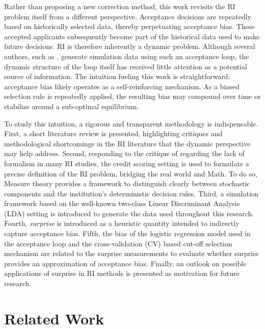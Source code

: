 \documentclass[
  12pt,
]{article}
\begin{document}
Rather than proposing a new correction method, this work revisits the RI
problem itself from a different perspective. Acceptance decisions are
repeatedly based on historically selected data, thereby perpetuating
acceptance bias. These accepted applicants subsequently become part of
the historical data used to make future decisions. RI is therefore
inherently a dynamic problem. Although several authors, such as
\textcite{kozdoi_et_al_BE_BASL}, generate simulation data using such an
acceptance loop, the dynamic structure of the loop itself has received
little attention as a potential source of information. The intuition
fueling this work is straightforward: acceptance bias likely operates as
a self-reinforcing mechanism. As a biased selection rule is repeatedly
applied, the resulting bias may compound over time or stabilize around a
sub-optimal equilibrium.

To study this intuition, a rigorous and transparent methodology is
indispensable. First, a short literature review is presented,
highlighting critiques and methodological shortcomings in the RI
literature that the dynamic perspective may help address. Second,
responding to the critique of \textcite{ehrhardt2021rejectReview}
regarding the lack of formalism in many RI studies, the credit scoring
setting is used to formulate a precise definition of the RI problem,
bridging the real world and Math. To do so, Measure theory provides a
framework to distinguish clearly between stochastic components and the
institution's deterministic decision rules. Third, a simulation
framework based on the well-known two-class Linear Discriminant Analysis
(LDA) setting is introduced to generate the data used throughout this
research. Fourth, \emph{surprise} is introduced as a heuristic quantity
intended to indirectly capture acceptance bias. Fifth, the bias of the
logistic regression model used in the acceptance loop and the
cross-validation (CV) based cut-off selection mechanism are related to
the surprise measurements to evaluate whether surprise provides an
approximation of acceptance bias. Finally, an outlook on possible
applications of surprise in RI methods is presented as motivation for
future research.

\newpage{}

\section{Related Work}\label{related-work}
\end{document}
